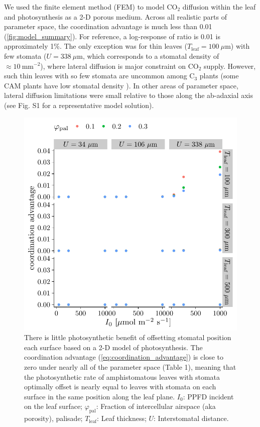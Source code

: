 \documentclass[webpdf,large,modern,unnumsec,namedate]{oup-authoring-template}
\begin{document}
We used the finite element method (FEM) to model CO\(_2\) diffusion
within the leaf and photosynthesis as a 2-D porous medium. Across all
realistic parts of parameter space, the coordination advantage is much
less than 0.01 (\autoref{fig:model_summary}). For reference, a
log-response of ratio is 0.01 is approximately 1\%. The only exception
was for thin leaves (\(T_\text{leaf} = 100~\mu \text{m}\)) with few
stomata (\(U = 338~\mu \text{m}\), which corresponds to a stomatal
density of \(\approx 10~\text{mm}^{-2}\)), where lateral diffusion is
major constraint on CO\(_2\) supply. However, such thin leaves with so
few stomata are uncommon among C\(_3\) plants (some CAM plants have low
stomatal density \citep{males_stomatal_2017}). In other areas of
parameter space, lateral diffusion limitations were small relative to
those along the ab-adaxial axis (see Fig. S1 for a representative model
solution).

\begin{figure}[ht]
\includegraphics[width = 5in]{figures/model_summary.pdf}
\caption{There is little photosynthetic benefit of offsetting stomatal position each surface based on a 2-D model of photosynthesis. The coordination advantage (\autoref{eq:coordination_advantage}) is close to zero under nearly all of the parameter space (Table 1), meaning that the photosynthetic rate of amphistomatous leaves with stomata optimally offset is nearly equal to leaves with stomata on each surface in the same position along the leaf plane. $I_0$: PPFD incident on the leaf surface; $\varphi_\text{pal}$: Fraction of intercellular airspace (aka porosity), palisade; $T_\text{leaf}$: Leaf thickness; $U$: Interstomatal distance.}
\label{fig:model_summary}
\end{figure}
\end{document}
